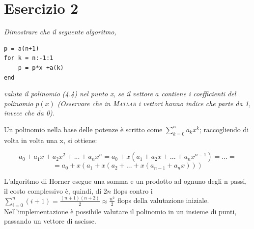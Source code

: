 \section{Esercizio 2}
\label{sub:Esercizio 2}
\emph{Dimostrare che il seguente algoritmo, \\}
\lstset{language=Matlab}
\begin{lstlisting}
p = a(n+1)
for k = n:-1:1
	p = p*x +a(k)
end
\end{lstlisting}
\emph{valuta il polinomio (4.4) nel punto x, se il vettore $a$ contiene i coefficienti del polinomio $p(x)$ (Osservare che in \textsc{Matlab} i vettori hanno indice che parte da 1, invece che da 0).}
\begin{sol}
	Un polinomio nella base delle potenze è scritto come
	$\sum_{k=0}^{n}a_{k}x^{k}$; raccogliendo di volta in volta una x,
	si ottiene:

		\[a_{0}+a_{1}x+a_{2}x^{2}+...+a_{n}x^{n}=a_{0}+x(a_{1}+a_{2}x+...+a_{n}x^{n-1})=...=
	\]
		\[=a_{0}+x(a_{1}+x(a_{2}+...+x(a_{n-1}+a_{n}x)))
	\]

	L'algoritmo di Horner esegue una somma e un prodotto ad
	ognuno degli n passi, il costo complessivo è, quindi, di $2n$ flops contro
	i $\sum_{i=0}^{n}(i+1)=\frac{(n+1)(n+2)}{2}\approx\frac{n^{2}}{2}$
	flops della valutazione iniziale. Nell'implementazione è possibile
	valutare il polinomio in un insieme di punti, passando un vettore
	di ascisse.
\end{sol}

